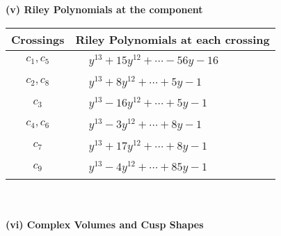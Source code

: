 \documentclass[1p]{elsarticle_modified}
\theoremstyle{definition}
\begin{document}
\newpage\renewcommand{\arraystretch}{1}
\flushleft \textbf{(v) Riley Polynomials at the component}\newline \\
\begin{tabular}{m{50pt}|m{274pt}}
Crossings & \hspace{64pt}Riley Polynomials at each crossing \\
\hline $$\begin{aligned}c_{1},c_{5}\end{aligned}$$&$\begin{aligned}
&y^{13}+15 y^{12}+\cdots-56 y-16
\end{aligned}$\\
\hline $$\begin{aligned}c_{2},c_{8}\end{aligned}$$&$\begin{aligned}
&y^{13}+8 y^{12}+\cdots+5 y-1
\end{aligned}$\\
\hline $$\begin{aligned}c_{3}\end{aligned}$$&$\begin{aligned}
&y^{13}-16 y^{12}+\cdots+5 y-1
\end{aligned}$\\
\hline $$\begin{aligned}c_{4},c_{6}\end{aligned}$$&$\begin{aligned}
&y^{13}-3 y^{12}+\cdots+8 y-1
\end{aligned}$\\
\hline $$\begin{aligned}c_{7}\end{aligned}$$&$\begin{aligned}
&y^{13}+17 y^{12}+\cdots+8 y-1
\end{aligned}$\\
\hline $$\begin{aligned}c_{9}\end{aligned}$$&$\begin{aligned}
&y^{13}-4 y^{12}+\cdots+85 y-1
\end{aligned}$\\
\hline
\end{tabular}\\~\\
\newpage\flushleft \textbf{(vi) Complex Volumes and Cusp Shapes}
\end{document}
